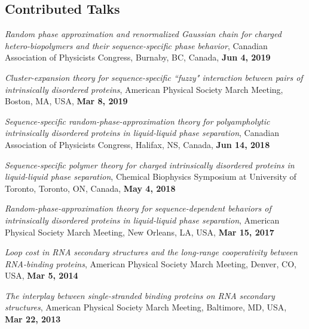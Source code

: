 \documentclass[11pt]{../yhlcv}
\begin{document}
\subsection*{Contributed Talks}
\begin{etaremune}[leftmargin=0.2in]

\item {\it Random phase approximation and renormalized Gaussian chain for charged 
	hetero-biopolymers and their sequence-specific phase behavior}, Canadian Association of Physicists Congress, Burnaby, BC, Canada, {\bf Jun 4, 2019}

\item {\it Cluster-expansion theory for sequence-specific ``fuzzy" interaction between pairs of 
	intrinsically disordered proteins}, American Physical Society March Meeting, Boston, MA, USA,
	{\bf Mar 8, 2019}

\item {\it Sequence-specific random-phase-approximation theory for polyampholytic intrinsically 
	disordered proteins in liquid-liquid phase separation}, Canadian Association of Physicists Congress,
	Halifax, NS, Canada,
	{\bf Jun 14, 2018}

\item {\it Sequence-specific polymer theory for charged intrinsically disordered proteins in liquid-liquid 
	phase separation}, Chemical Biophysics Symposium at University of Toronto, Toronto, ON, Canada, 
	{\bf May 4, 2018}

\item {\it Random-phase-approximation theory for sequence-dependent behaviors of intrinsically
	 disordered proteins in liquid-liquid phase separation}, American Physical Society March Meeting, New Orleans, LA, USA,
	{\bf Mar 15, 2017}

\item {\it Loop cost in RNA secondary structures and the long-range cooperativity between RNA-binding proteins}, American Physical Society March Meeting, Denver, CO, USA, {\bf Mar 5, 2014}
	
\item {\it The interplay between single-stranded binding proteins on RNA secondary structures}, American Physical Society March Meeting, Baltimore, MD, USA, {\bf Mar 22, 2013}

\end{etaremune}
\end{document}
